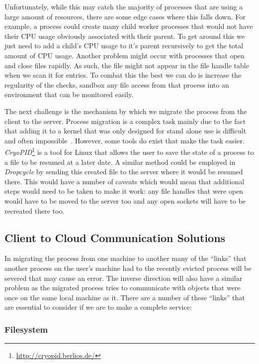 \documentclass[12pt, a4paper]{article}
\begin{document}
Unfortunately, while this may catch the majority of processes that are using
a large amount of resources, there are some edge cases where this falls down.
For example, a process could create many child worker processes that would not
have their CPU usage obviously associated with their parent. To get around this
we just need to add a child's CPU usage to it's parent recursively to get the
total amount of CPU usage. Another problem might occur with processes that open
and close files rapidly. As such, the file might not appear in the file handle
table when we scan it for entries. To combat this the best we can do is
increase the regularity of the checks, sandbox any file access from that
process into an environment that can be monitored easily.

The next challenge is the mechanism by which we migrate the process from the
client to the server. Process migration is a complex task mainly due to the
fact that adding it to a kernel that was only designed for stand alone use is
difficult and often impossible~\cite{Milojicic1999}. However, some tools do
exist that make the task easier.
\emph{CryoPID}\footnote{\url{http://cryopid.berlios.de/}} is a tool for Linux
that allows the user to save the state of a process to a file to be resumed at
a later date. A similar method could be employed in \emph{Dropcycle} by sending
this created file to the server where it would be resumed there. This would
have a number of caveats which would mean that additional steps would need to
be taken to make it work: any file handles that were open would have to be
moved to the server too and any open sockets will have to be recreated there
too.

\subsection{Client to Cloud Communication Solutions}

In migrating the process from one machine to another many of the ``links'' that
another process on the user's machine had to the recently evicted process will
be severed that may cause an error. The inverse direction will also have
a similar problem as the migrated process tries to communicate with objects
that were once on the same local machine as it. There are a number of these
``links'' that are essential to consider if we are to make a complete service:

\subsubsection{Filesystem}
\end{document}
